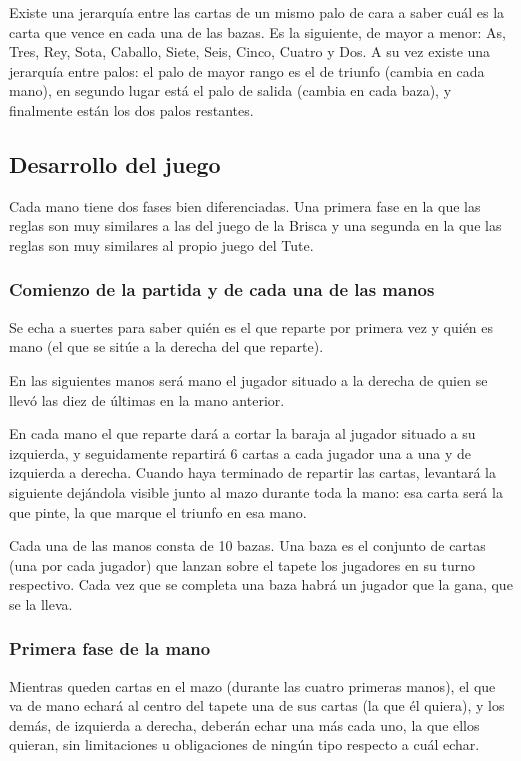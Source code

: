 \documentclass{article}
\begin{document}
Existe una jerarquía entre las cartas de un mismo palo de cara a saber cuál es la carta que vence en cada una de las bazas. Es la siguiente, de mayor a menor: As, Tres, Rey, Sota, Caballo, Siete, Seis, Cinco, Cuatro y Dos. A su vez existe una jerarquía entre palos: el palo de mayor rango es el de triunfo (cambia en cada mano), en segundo lugar está el palo de salida (cambia en cada baza), y finalmente están los dos palos restantes.

\subsection*{Desarrollo del juego}
Cada mano tiene dos fases bien diferenciadas. Una primera fase en la que las reglas son muy similares a las del juego de la Brisca y una segunda en la que las reglas son muy similares al propio juego del Tute.
\subsubsection*{Comienzo de la partida y de cada una de las manos}
Se echa a suertes para saber quién es el que reparte por primera vez y quién es mano (el que se sitúe a la derecha del que reparte).

En las siguientes manos será mano el jugador situado a la derecha de quien se llevó las diez de últimas en la mano anterior.

En cada mano el que reparte dará a cortar la baraja al jugador situado a su izquierda, y seguidamente repartirá 6 cartas a cada jugador una a una y de izquierda a derecha. Cuando haya terminado de repartir las cartas, levantará la siguiente dejándola visible junto al mazo durante toda la mano: esa carta será la que pinte, la que marque el triunfo en esa mano.

Cada una de las manos consta de 10 bazas. Una baza es el conjunto de cartas (una por cada jugador) que lanzan sobre el tapete los jugadores en su turno respectivo. Cada vez que se completa una baza habrá un jugador que la gana, que se la lleva.
\subsubsection*{Primera fase de la mano}
Mientras queden cartas en el mazo (durante las cuatro primeras manos), el que va de mano echará al centro del tapete una de sus cartas (la que él quiera), y los demás, de izquierda a derecha, deberán echar una más cada uno, la que ellos quieran, sin limitaciones u obligaciones de ningún tipo respecto a cuál echar.
\end{document}
